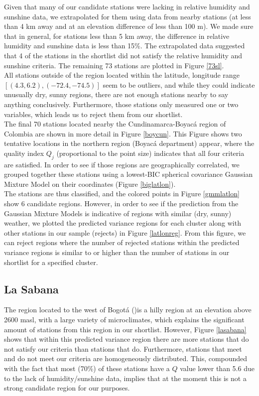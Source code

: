 \documentclass[12pt]{iopart}
\begin{document}
Given that many of our candidate stations were lacking in relative humidity and sunshine data, we extrapolated for them using data from nearby stations (at less than 4 km away and at an elevation difference of less than 100 m). We made sure that in general, for stations less than 5 km away, the difference in relative humidity and sunshine data is less than 15\%. The extrapolated data suggested that 4 of the stations in the shortlist did not satisfy the relative humidity and sunshine criteria.  The remaining 73 stations are plotted in Figure \ref{73sl}.\\

All stations outside of the region located within the latitude, longitude range $[(4.3,6.2),(-72.4,-74.5)]$ seem to be outliers, and while they could indicate unusually dry, sunny regions, there are not enough stations nearby to say anything conclusively. Furthermore, those stations only measured one or two variables, which leads us to reject them from our shortlist. \\

The final 70 stations located nearby the Cundinamarca-Boyac\'a region of Colombia are shown in more detail in Figure \ref{boycun}. This Figure shows two tentative locations in the northern region (Boyac\'a department) appear, where the quality index $Q_j$ (proportional to the point size) indicates that all four criteria are satisfied. In order to see if those regions are geographically correlated, we grouped together these stations using a lowest-BIC spherical covariance Gaussian Mixture Model on their coordinates (Figure \ref{biglatlon}).\\

The stations are thus classified, and the colored points in Figure \ref{gmmlatlon} show 6 candidate regions. However, in order to see if the prediction from the Gaussian Mixture Models is indicative of regions with similar (dry, sunny) weather, we plotted the predicted variance regions for each cluster along with other stations in our sample (rejects) in Figure \ref{latlonreg}. From this figure, we can reject regions where the number of rejected stations within the predicted variance regions is similar to or higher than the number of stations in our shortlist for a specified cluster.

\subsection{La Sabana}

The region located to the west of Bogot\'a ()is a hilly region at an elevation above 2600 masl, with a large variety of microclimates, which explains the significant amount of stations from this region in our shortlist. However, Figure \ref{lasabana} shows that within this predicted variance region there are more stations that do not satisfy our criteria than stations that do. Furthermore, stations that meet and do not meet our criteria are homogeneously distributed. This, compounded with the fact that most (70\%) of these stations have a $Q$ value lower than 5.6 due to the lack of humidity/sunshine data, implies that at the moment this is not a strong candidate region for our purposes.
\end{document}
